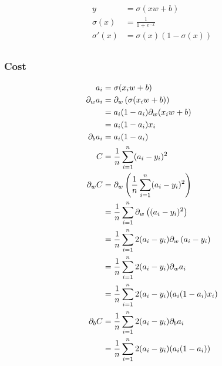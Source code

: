 \documentclass{article}
\begin{document}
\begin{align}
	y &= \sigma(xw + b) \\
	\sigma(x) &= \frac{1}{1 + e^{-x}} \\
	\sigma'(x) &= \sigma(x)(1 - \sigma(x)) \\
\end{align}

\subsubsection{Cost}

\def\pd[#1]{\partial_{#1}}

\begin{align}
	a_i &= \sigma(x_iw + b) \\
	\pd[w]a_i 
		&= \pd[w]\left(\sigma(x_iw + b)\right) \\
		&= a_i(1 - a_i)\pd[w](x_iw + b) \\
		&= a_i(1 - a_i)x_i \\
	\pd[b]a_i 
		&= a_i(1 - a_i) \\
	C &= \avgsum[i,n](a_i - y_i)^2 \\
	\pd[w]C 
		&= \pd[w]\left(\avgsum[i,n](a_i - y_i)^2\right) \\
		&= \avgsum[i,n]\pd[w]\left((a_i - y_i)^2\right) \\
		&= \avgsum[i,n]2(a_i - y_i)\pd[w]\left(a_i - y_i\right) \\
		&= \avgsum[i,n]2(a_i - y_i)\pd[w]a_i \\
		&= \avgsum[i,n]2(a_i - y_i)(a_i(1 - a_i)x_i) \\
	\pd[b]C 
		&= \avgsum[i,n]2(a_i - y_i)\pd[b]a_i \\
		&= \avgsum[i,n]2(a_i - y_i)(a_i(1 - a_i)) \\
\end{align}
\end{document}
